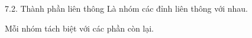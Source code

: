 \documentclass{beamer}
\begin{document}
\begin{frame}{7.2. Thành phần liên thông}
\Large
Là nhóm các đỉnh liên thông với nhau.

\vspace{0.3cm}
Mỗi nhóm tách biệt với các phần còn lại.
\end{frame}
\end{document}
